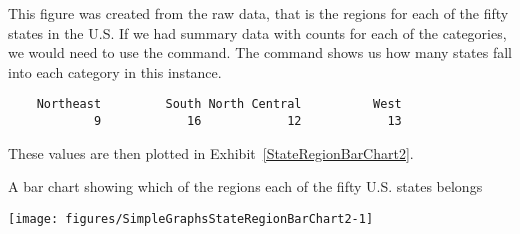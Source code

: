 This figure was created from the raw data, that is the regions for each of the fifty states in the U.S. If we had summary data with counts for each of the categories, we would need to use the  command. The  command shows us how many states fall into each category in this instance. 
\begin{knitrout}
\color{fgcolor}\begin{kframe}
\begin{alltt}
\hlstd{> }
\end{alltt}
\begin{verbatim}
    Northeast         South North Central          West 
            9            16            12            13 
\end{verbatim}
\end{kframe}
\end{knitrout}
These values are then plotted in Exhibit~\ref{StateRegionBarChart2}. 
\begin{exhibit} 
\begin{center} 
\caption{A bar chart showing which of the regions each of the fifty U.S. states belongs} 
\label{StateRegionBarChart2} 
\begin{knitrout}
\color{fgcolor}\begin{kframe}
\begin{alltt}
\hlstd{> }\hlstd{(}
\end{alltt}
\end{kframe}
\texttt{[image: figures/SimpleGraphsStateRegionBarChart2-1]} 

\end{knitrout}
\end{center} 
\end{exhibit} 
 
